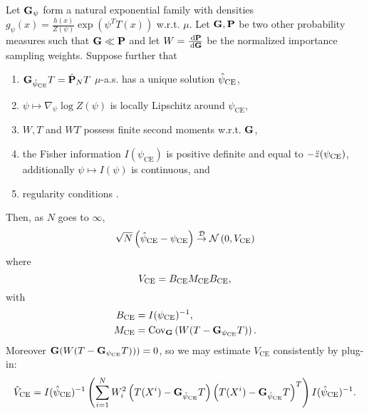 \begin{theorem}
    \label{thm:ce-clt}
    Let $\mathbf G_{\psi}$ form a natural exponential family with densities $g_{\psi}(x) = \frac{h(x)}{Z(\psi)} \exp \left( \psi^{T}T(x)\right) $ w.r.t. $\mu$. Let $\mathbf G, \mathbf P$ be two other probability measures such that $\mathbf G \ll \mathbf P$ and let $W = \frac{\,\mathrm d \mathbf P}{\,\mathrm d \mathbf G}$ be the normalized importance sampling weights. 
    Suppose further that 
    \begin{enumerate}[label={\bfseries(A{\arabic*})}]
        \item\label{it:exist-unique-psice} $\mathbf G_{{\hat\psi_{\text{CE}}}} T = \hat{\mathbf P}_{N} T$ $\mu$-a.s. has a unique solution ${\hat\psi_{\text{CE}}}$,
        \item\label{it:zdot-ll} $\psi \mapsto \nabla_\psi \log Z(\psi)$ is locally Lipschitz around $\psi_{\text{CE}}$,
        \item\label{it:w-t-wt-L2} $W,T$ and $WT$ possess finite second moments  w.r.t. $\mathbf G$,
        \item\label{it:FI-psd} the Fisher information $I(\psi_{\text{CE}})$ is positive definite and equal to $-\ddot z({\psi_{\text{CE}}})$, additionally $\psi \mapsto I(\psi)$ is continuous, and
        \item\label{it:ce-regularity} regularity conditions .
    \end{enumerate}

    Then, as $N$ goes to $\infty$,
    $$
        \sqrt{N} \left(\hat\psi_\text{CE} - \psi_{\text{CE}}\right) \stackrel{\mathcal D}{\to} \mathcal N \left(0, V_{\text{CE}}\right)
    $$
    where 
    $$
    V_{\text{CE}} = B_\ce M_\ce B_\ce,%
    $$
    with 
    \begin{align*}
        B_{{\text{CE}}} &= I({\psi_{\text{CE}}})^{-1}, \\
        M_{{\text{CE}}} &= \text{Cov}_{\mathbf G} \left( W (T - \mathbf G_{{\psi_{\text{CE}}}}T) \right).
    \end{align*}
    Moreover $\mathbf G (W(T - \mathbf G_{{\psi_{\text{CE}}}}T))) = 0$, so we may estimate $V_{\text{CE}}$ consistently by plug-in:
    $$
    \hat V_{\text{CE}} = I(\hat\psi_{\text{CE}})^{-1}  \left(\sum_{i = 1}^N W^{2}_{i} \left(T(X^{i}) - \mathbf G_{{\hat\psi_{\text{CE}}}}T \right)\left(T(X^{i}) - \mathbf G_{{\hat\psi_{\text{CE}}}} T\right)^{T} \right)I(\hat\psi_{\text{CE}})^{-1}.
    $$
\end{theorem}

